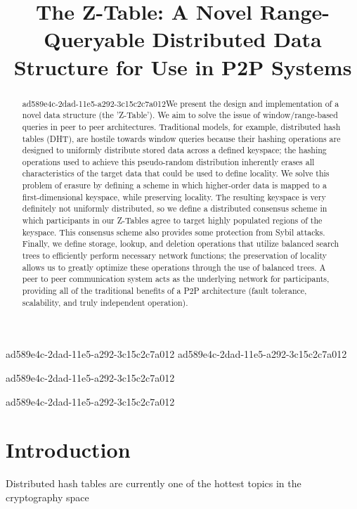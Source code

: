 \documentclass[12pt]{article}
\title{The Z-Table: A Novel Range-Queryable Distributed Data Structure for Use in P2P Systems}
\begin{document}
ad589e4c-2dad-11e5-a292-3c15c2c7a012
ad589e4c-2dad-11e5-a292-3c15c2c7a012\maketitle

\begin{abstract}
ad589e4c-2dad-11e5-a292-3c15c2c7a012We present the design and implementation of a novel data structure (the 'Z-Table'). We aim to solve the issue of window/range-based queries in peer to peer architectures. Traditional models, for example,  distributed hash tables (DHT), are hostile towards window queries because their hashing operations are designed to uniformly distribute stored data across a defined keyspace; the hashing operations used to achieve this pseudo-random distribution inherently erases all characteristics of the target data that could be used to define locality. We solve this problem of erasure by defining a scheme in which higher-order data is mapped to a first-dimensional keyspace, while preserving locality. The resulting keyspace is very definitely not uniformly distributed, so we define a distributed consensus scheme in which participants in our Z-Tables agree to target highly populated regions of the keyspace. This consensus scheme also provides some protection from Sybil attacks. Finally, we define storage, lookup, and deletion operations that utilize balanced search trees to efficiently perform necessary network functions; the preservation of locality allows us to greatly optimize these operations through the use of balanced trees. A peer to peer communication system acts as the underlying network for participants, providing all of the traditional benefits of a P2P architecture (fault tolerance, scalability, and truly independent operation).
\end{abstract}
ad589e4c-2dad-11e5-a292-3c15c2c7a012

ad589e4c-2dad-11e5-a292-3c15c2c7a012\newpage
\section{Introduction}
Distributed hash tables are currently one of the hottest topics in the cryptography space~\cite{Stoica:2001dj,Rowstron:2001ea,Ratnasamy:2001wn}

\printbibliography
\end{document}
